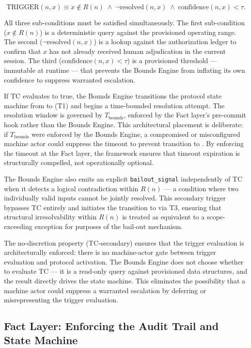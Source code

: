 \[
\text{TRIGGER}(n, x) \equiv x \notin R(n) \;\land\; \neg\text{resolved}(n, x) \;\land\; \text{confidence}(n, x) < \tau .
\]

All three sub-conditions must be satisfied simultaneously.  The first
sub-condition ($x \notin R(n)$) is a deterministic query against the provisioned
operating range.  The second ($\neg\text{resolved}(n, x)$) is a lookup against
the authorization ledger to confirm that $x$ has not already received human
adjudication in the current session.  The third ($\text{confidence}(n, x) < \tau$)
is a provisioned threshold — immutable at runtime — that prevents the Bounds
Engine from inflating its own confidence to suppress warranted escalation.

If TC evaluates to true, the Bounds Engine transitions the protocol state
machine from  to  (T1) and begins a time-bounded
resolution attempt.  The resolution window is governed by $T_{\text{bounds}}$,
enforced by the Fact layer's pre-commit hook rather than the Bounds Engine.
This architectural placement is deliberate: if $T_{\text{bounds}}$ were
enforced by the Bounds Engine, a compromised or misconfigured machine actor
could suppress the timeout to prevent transition to .
By enforcing the timeout at the Fact layer, the framework ensures that
timeout expiration is structurally compelled, not operationally optional.

The Bounds Engine also emits an explicit \texttt{bailout\_signal} independently
of TC when it detects a logical contradiction within $R(n)$ — a condition
where two individually valid inputs cannot be jointly resolved.  This secondary
trigger bypasses TC entirely and initiates the transition to 
via T3, ensuring that structural irresolvability within $R(n)$ is treated as
equivalent to a scope-exceeding exception for purposes of the bail-out mechanism.

The no-discretion property (TC-secondary) ensures that the trigger evaluation
is architecturally enforced: there is no machine-actor gate between trigger
evaluation and protocol activation.  The Bounds Engine does not choose whether
to evaluate TC — it is a read-only query against provisioned data structures,
and the result directly drives the state machine.  This eliminates the possibility
that a machine actor could suppress a warranted escalation by deferring or
misrepresenting the trigger evaluation.

\subsection{Fact Layer: Enforcing the Audit Trail and State Machine}\label{sec:fact-enforcement}

